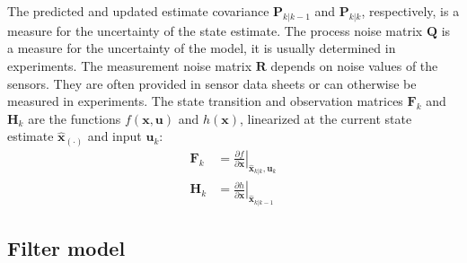 The predicted and updated estimate covariance $\bm{P}_{k|k-1}$ and $\bm{P}_{k|k}$, respectively, is a measure for the uncertainty of the state estimate. The process noise matrix $\bm{Q}$ is a measure for the uncertainty of the model, it is usually determined in experiments. The measurement noise matrix $\bm{R}$ depends on noise values of the sensors. They are often provided in sensor data sheets or can otherwise be measured in experiments. The state transition and observation matrices $\bm{F}_k$ and $\bm{H}_k$ are the functions $f(\bm{x},\bm{u})$ and $h(\bm{x})$, linearized at the current state estimate $\hat{\bm{x}}_{(\cdot)}$ and input $\bm{u}_k$:
\begin{subequations}
\begin{align}
\bm{F}_k &= \left. \frac{\partial f}{\partial \bm{x}} \right|_{\hat{\bm{x}}_{k|k},\bm{u}_k}\\
\bm{H}_k &= \left. \frac{\partial h}{\partial \bm{x}} \right|_{\hat{\bm{x}}_{k|k-1}}
\end{align}
\end{subequations}
\subsection{Filter model}\label{sec:filterModel}

